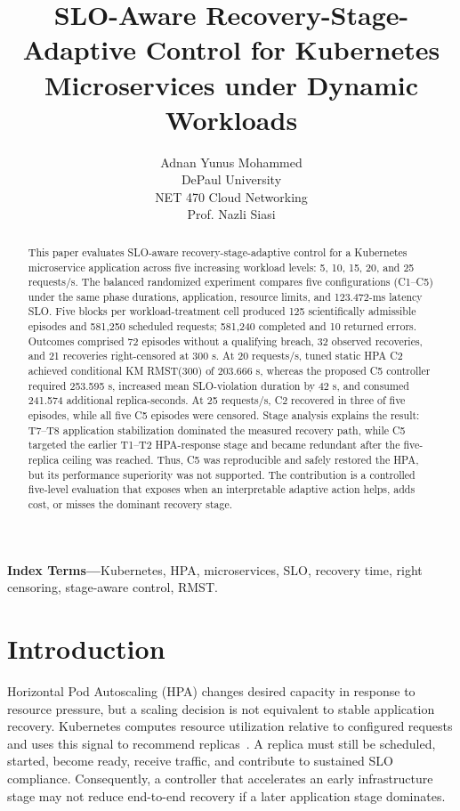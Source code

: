 \documentclass[10pt,twocolumn]{article}
\title{SLO-Aware Recovery-Stage-Adaptive Control for Kubernetes Microservices under Dynamic Workloads}
\author{Adnan Yunus Mohammed\\DePaul University\\NET 470 Cloud Networking\\Prof. Nazli Siasi}
\date{}
\begin{document}
\maketitle

\begin{abstract}
This paper evaluates SLO-aware recovery-stage-adaptive control for a Kubernetes microservice application across five increasing workload levels: 5, 10, 15, 20, and 25 requests/s. The balanced randomized experiment compares five configurations (C1--C5) under the same phase durations, application, resource limits, and 123.472-ms latency SLO. Five blocks per workload-treatment cell produced 125 scientifically admissible episodes and 581,250 scheduled requests; 581,240 completed and 10 returned errors. Outcomes comprised 72 episodes without a qualifying breach, 32 observed recoveries, and 21 recoveries right-censored at 300 s. At 20 requests/s, tuned static HPA C2 achieved conditional KM RMST(300) of 203.666 s, whereas the proposed C5 controller required 253.595 s, increased mean SLO-violation duration by 42 s, and consumed 241.574 additional replica-seconds. At 25 requests/s, C2 recovered in three of five episodes, while all five C5 episodes were censored. Stage analysis explains the result: T7--T8 application stabilization dominated the measured recovery path, while C5 targeted the earlier T1--T2 HPA-response stage and became redundant after the five-replica ceiling was reached. Thus, C5 was reproducible and safely restored the HPA, but its performance superiority was not supported. The contribution is a controlled five-level evaluation that exposes when an interpretable adaptive action helps, adds cost, or misses the dominant recovery stage.
\end{abstract}

\noindent\textbf{Index Terms---}Kubernetes, HPA, microservices, SLO, recovery time, right censoring, stage-aware control, RMST.

\section{Introduction}
Horizontal Pod Autoscaling (HPA) changes desired capacity in response to resource pressure, but a scaling decision is not equivalent to stable application recovery. Kubernetes computes resource utilization relative to configured requests and uses this signal to recommend replicas~\cite{k8shpa}. A replica must still be scheduled, started, become ready, receive traffic, and contribute to sustained SLO compliance. Consequently, a controller that accelerates an early infrastructure stage may not reduce end-to-end recovery if a later application stage dominates.
\end{document}

